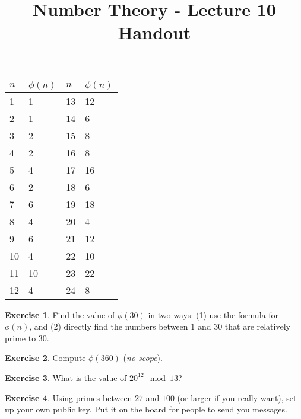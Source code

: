 \documentclass[11pt]{article}
\theoremstyle{definition}
\newtheorem{exercise}{Exercise}
\numberwithin{thm}{section}
\begin{document}
\title{Number Theory - Lecture 10 Handout}

\maketitle


\begin{table}[!ht]
\begin{tabular}{l|l|l|l}
$n$ & $\phi(n)$ & $n$ & $\phi(n)$ \\ \hline
1   & 1         & 13  & 12        \\
2   & 1         & 14  & 6         \\
3   & 2         & 15  & 8         \\
4   & 2         & 16  & 8         \\
5   & 4         & 17  & 16        \\
6   & 2         & 18  & 6         \\
7   & 6         & 19  & 18        \\
8   & 4         & 20  & 4         \\
9   & 6         & 21  & 12        \\
10  & 4         & 22  & 10        \\
11  & 10        & 23  & 22        \\
12  & 4         & 24  & 8        
\end{tabular}
\end{table}

\begin{exercise} Find the value of $\phi(30)$ in two ways: (1) use the formula for $\phi(n)$, and (2) directly find the numbers between $1$ and $30$ that are relatively prime to $30$.
\end{exercise}

\begin{exercise} Compute $\phi(360)$ (\textit{no scope}).
\end{exercise}

\begin{exercise} What is the value of $ 20^{12} \mod 13$?
\end{exercise}

\begin{exercise} Using primes between $27$ and $100$ (or larger if you really want), set up your own public key. Put it on the board for people to send you messages. 
\end{exercise}
\end{document}
